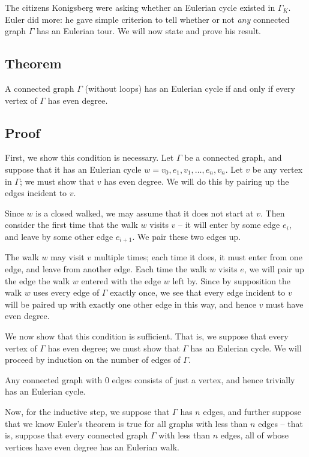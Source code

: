 \documentclass[]{article}
\begin{document}
The citizens Konigsberg were asking whether an Eulerian cycle existed in
\(\Gamma_K\). Euler did more: he gave simple criterion to tell whether
or not \emph{any} connected graph \(\Gamma\) has an Eulerian tour. We
will now state and prove his result.

\subsection{Theorem}\label{theorem}

A connected graph \(\Gamma\) (without loops) has an Eulerian cycle if
and only if every vertex of \(\Gamma\) has even degree.

\subsection{Proof}\label{proof-3}

First, we show this condition is necessary. Let \(\Gamma\) be a
connected graph, and suppose that it has an Eulerian cycle
\(w=v_0, e_1, v_1,\dots, e_n, v_n\). Let \(v\) be any vertex in
\(\Gamma\); we must show that \(v\) has even degree. We will do this by
pairing up the edges incident to \(v\).

Since \(w\) is a closed walked, we may assume that it does not start at
\(v\). Then consider the first time that the walk \(w\) visits \(v\) --
it will enter by some edge \(e_i\), and leave by some other edge
\(e_{i+1}\). We pair these two edges up.

The walk \(w\) may visit \(v\) multiple times; each time it does, it
must enter from one edge, and leave from another edge. Each time the
walk \(w\) visits \(e\), we will pair up the edge the walk \(w\) entered
with the edge \(w\) left by. Since by supposition the walk \(w\) uses
every edge of \(\Gamma\) exactly once, we see that every edge incident
to \(v\) will be paired up with exactly one other edge in this way, and
hence \(v\) must have even degree.

We now show that this condition is sufficient. That is, we suppose that
every vertex of \(\Gamma\) has even degree; we must show that \(\Gamma\)
has an Eulerian cycle. We will proceed by induction on the number of
edges of \(\Gamma\).

Any connected graph with 0 edges consists of just a vertex, and hence
trivially has an Eulerian cycle.

Now, for the inductive step, we suppose that \(\Gamma\) has \(n\) edges,
and further suppose that we know Euler's theorem is true for all graphs
with less than \(n\) edges -- that is, suppose that every connected
graph \(\Gamma\) with less than \(n\) edges, all of whose vertices have
even degree has an Eulerian walk.
\end{document}
